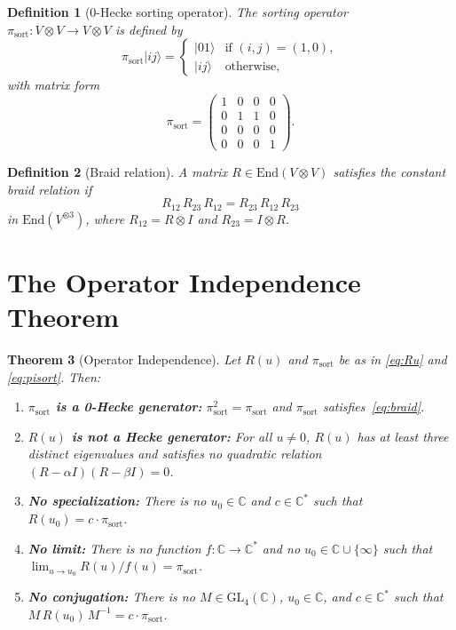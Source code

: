 \documentclass[11pt]{article}
\newtheorem{theorem}{Theorem}
\newtheorem{definition}[theorem]{Definition}
\theoremstyle{remark}
\newcommand{\CC}{\mathbb{C}}
\newcommand{\ket}[1]{|#1\rangle}
\newcommand{\pisort}{\pi_{\mathrm{sort}}}
\begin{document}
\begin{definition}[0-Hecke sorting operator]\label{def:pisort}
The \emph{sorting operator} $\pisort\colon V \otimes V \to V \otimes V$
is defined by
\[
  \pisort \ket{ij} =
  \begin{cases}
    \ket{01} & \text{if } (i,j) = (1,0), \\
    \ket{ij} & \text{otherwise},
  \end{cases}
\]
with matrix form
\begin{equation}\label{eq:pisort}
  \pisort = \begin{pmatrix}
    1 & 0 & 0 & 0 \\
    0 & 1 & 1 & 0 \\
    0 & 0 & 0 & 0 \\
    0 & 0 & 0 & 1
  \end{pmatrix}.
\end{equation}
\end{definition}

\begin{definition}[Braid relation]
A matrix $R \in \mathrm{End}(V \otimes V)$ satisfies the
\emph{constant braid relation} if
\begin{equation}\label{eq:braid}
  R_{12}\, R_{23}\, R_{12} = R_{23}\, R_{12}\, R_{23}
\end{equation}
in $\mathrm{End}(V^{\otimes 3})$, where $R_{12} = R \otimes I$ and
$R_{23} = I \otimes R$.
\end{definition}

\section{The Operator Independence Theorem}

\begin{theorem}[Operator Independence]\label{thm:main}
Let $R(u)$ and $\pisort$ be as in \eqref{eq:Ru} and \eqref{eq:pisort}. Then:
\begin{enumerate}
  \item \textbf{$\pisort$ is a 0-Hecke generator:}
    $\pisort^2 = \pisort$ and $\pisort$ satisfies~\eqref{eq:braid}.
  \item \textbf{$R(u)$ is not a Hecke generator:}
    For all $u \neq 0$, $R(u)$ has at least three distinct eigenvalues
    and satisfies no quadratic relation $(R - \alpha I)(R - \beta I) = 0$.
  \item \textbf{No specialization:}
    There is no $u_0 \in \CC$ and $c \in \CC^*$ such that
    $R(u_0) = c \cdot \pisort$.
  \item \textbf{No limit:}
    There is no function $f\colon \CC \to \CC^*$ and no
    $u_0 \in \CC \cup \{\infty\}$ such that
    $\lim_{u \to u_0} R(u)/f(u) = \pisort$.
  \item \textbf{No conjugation:}
    There is no $M \in \mathrm{GL}_4(\CC)$, $u_0 \in \CC$, and
    $c \in \CC^*$ such that $M\, R(u_0)\, M^{-1} = c \cdot \pisort$.
\end{enumerate}
\end{theorem}
\end{document}
